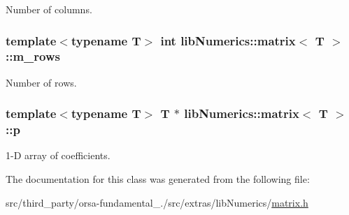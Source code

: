 Number of columns. 

\hypertarget{classlibNumerics_1_1matrix_a385a7057ca792f9bad1ab7b9d1076ea9}{}
\subsubsection[{m\+\_\+rows}]{\setlength{\rightskip}{0pt plus 5cm}template$<$typename T$>$ int {\bf lib\+Numerics\+::matrix}$<$ T $>$\+::m\+\_\+rows\hspace{0.3cm}{\ttfamily [protected]}}\label{classlibNumerics_1_1matrix_a385a7057ca792f9bad1ab7b9d1076ea9}


Number of rows. 

\hypertarget{classlibNumerics_1_1matrix_a2129a3166fc1209becd143b13225e3c4}{}
\subsubsection[{p}]{\setlength{\rightskip}{0pt plus 5cm}template$<$typename T$>$ T $\ast$ {\bf lib\+Numerics\+::matrix}$<$ T $>$\+::p\hspace{0.3cm}{\ttfamily [protected]}}\label{classlibNumerics_1_1matrix_a2129a3166fc1209becd143b13225e3c4}


1-\/\+D array of coefficients. 



The documentation for this class was generated from the following file\+:\begin{DoxyCompactItemize}
\item 
src/third\+\_\+party/orsa-\/fundamental\+\_./src/extras/lib\+Numerics/\hyperlink{extras_2libNumerics_2matrix_8h}{matrix.\+h}\end{DoxyCompactItemize}
